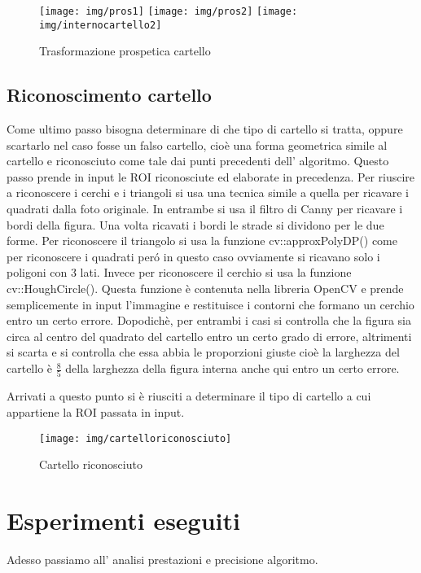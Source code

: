 	\begin{figure}[!ht]
		\centering
		\texttt{[image: img/pros1]}
		\texttt{[image: img/pros2]}
		\texttt{[image: img/internocartello2]}
		\caption{Trasformazione prospetica cartello}
	\end{figure}

\subsection{Riconoscimento cartello}

	Come ultimo passo bisogna determinare di che tipo di cartello si tratta, oppure scartarlo nel caso fosse un falso cartello, cioè una forma geometrica simile al cartello e riconosciuto come tale dai punti precedenti dell' algoritmo. Questo passo prende in input le ROI riconosciute ed elaborate in precedenza. Per riuscire a riconoscere i cerchi e i triangoli si usa una tecnica simile a quella per ricavare i quadrati dalla foto originale. In entrambe si usa il filtro di Canny per ricavare i bordi della figura. Una volta ricavati i bordi le strade si dividono per le due forme. Per riconoscere il triangolo si usa la funzione cv::approxPolyDP() come per riconoscere i quadrati per\'o in questo caso ovviamente si ricavano solo i poligoni con 3 lati. Invece per riconoscere il cerchio si usa la funzione cv::HoughCircle(). Questa funzione è contenuta nella libreria OpenCV e prende semplicemente in input l'immagine e restituisce i contorni che formano un cerchio entro un certo errore. Dopodichè, per entrambi i casi si controlla che la figura sia circa al centro del quadrato del cartello entro un certo grado di errore, altrimenti si scarta e si controlla che essa abbia le proporzioni giuste cioè la larghezza del cartello è $\frac{8}{5}$ della larghezza della figura interna anche qui entro un certo errore.

	Arrivati a questo punto si è riusciti a determinare il tipo di cartello a cui appartiene la ROI passata in input. 
	\begin{figure}[!ht]
		\centering
		\texttt{[image: img/cartelloriconosciuto]}
		\caption{Cartello riconosciuto}
	\end{figure}

\section{Esperimenti eseguiti}

	Adesso passiamo all' analisi prestazioni e precisione algoritmo.


